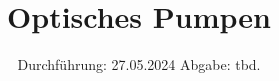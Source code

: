 

\subject{Versuch V21}
\title{Optisches Pumpen}
\date{%
  Durchführung: 27.05.2024
  \hspace{3em}
  Abgabe: tbd.
}



\maketitle
\thispagestyle{empty}
\tableofcontents
\newpage



%
%

\printbibliography
%
%

